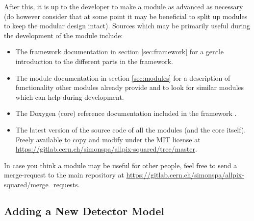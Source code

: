 After this, it is up to the developer to make a module as advanced as necessary (do however consider that at some point it may be beneficial to split up modules to keep the modular design intact). Sources which may be primarily useful during the development of the module include:
\begin{itemize}
\item The framework documentation in section \ref{sec:framework} for a gentle introduction to the different parts in the framework.
\item The module documentation in section \ref{sec:modules} for a description of functionality other modules already provide and to look for similar modules which can help during development.
\item The Doxygen (core) reference documentation included in the framework .
\item The latest version of the source code of all the modules (and the core itself). Freely available to copy and modify under the MIT license at \url{https://gitlab.cern.ch/simonspa/allpix-squared/tree/master}.
\end{itemize}

In case you think a module may be useful for other people, feel free to send a merge-request to the main repository at \url{https://gitlab.cern.ch/simonspa/allpix-squared/merge_requests}.

\subsection{Adding a New Detector Model}
\label{sec:adding_detector_model}
\wip
{}
